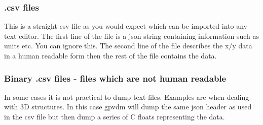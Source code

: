 \subsubsection{.csv files}
This is a straight csv file as you would expect which can be imported into any text editor.  The first line of the file is a json string containing information such as units etc.  You can ignore this. The second line of the file describes the x/y data in a human readable form then the rest of the file contains the data.

\subsubsection{Binary .csv files - files which are not human readable}
In some cases it is not practical to dump text files. Examples are when dealing with 3D structures.  In this case gpvdm will dump the same json header as used in the csv file but then dump a series of C floats representing the data.

